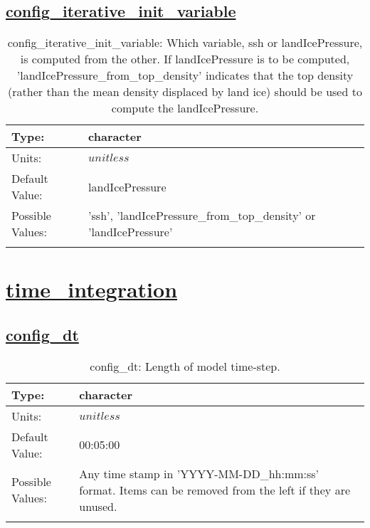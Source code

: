 \subsection[config\_iterative\_init\_variable]{\hyperref[sec:nm_tab_init_ssh_and_landIcePressure]{config\_iterative\_init\_variable}}
\label{subsec:nm_sec_config_iterative_init_variable}
\begin{center}
\begin{longtable}{| p{2.0in} || p{4.0in} |}
    \hline
    Type: & character \\
    \hline
    Units: & $unitless$ \\
    \hline
    Default Value: & landIcePressure \\
    \hline
    Possible Values: & 'ssh', 'landIcePressure\_from\_top\_density' or 'landIcePressure' \\
    \hline
    \caption{config\_iterative\_init\_variable: Which variable, ssh or landIcePressure, is computed from the other.  If landIcePressure is to be computed, 'landIcePressure\_from\_top\_density' indicates that the top density (rather than the mean density displaced by land ice) should be used to compute the landIcePressure.}
\end{longtable}
\end{center}
\section[time\_integration]{\hyperref[sec:nm_tab_time_integration]{time\_integration}}
\label{sec:nm_sec_time_integration}
\subsection[config\_dt]{\hyperref[sec:nm_tab_time_integration]{config\_dt}}
\label{subsec:nm_sec_config_dt}
\begin{center}
\begin{longtable}{| p{2.0in} || p{4.0in} |}
    \hline
    Type: & character \\
    \hline
    Units: & $unitless$ \\
    \hline
    Default Value: & 00:05:00 \\
    \hline
    Possible Values: & Any time stamp in 'YYYY-MM-DD\_hh:mm:ss' format. Items can be removed from the left if they are unused. \\
    \hline
    \caption{config\_dt: Length of model time-step.}
\end{longtable}
\end{center}
